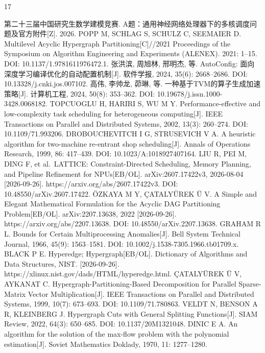 \documentclass[anonymous,notoc]{gmcm2026}
\begin{document}
\FloatBarrier
\clearpage\begin{thebibliography}{17}
\raggedright
{} 第二十三届中国研究生数学建模竞赛. A题：通用神经网络处理器下的多核调度问题及官方附件{[}Z{]}. 2026.
 POPP M, SCHLAG S, SCHULZ C, SEEMAIER D. Multilevel Acyclic Hypergraph Partitioning{[}C{]}//2021 Proceedings of the Symposium on Algorithm Engineering and Experiments (ALENEX). 2021: 1--15. DOI: 10.1137/1.9781611976472.1.
 张洪滨, 周旭林, 邢明杰, 等. AutoConfig: 面向深度学习编译优化的自动配置机制{[}J{]}. 软件学报, 2024, 35(6): 2668--2686. DOI: 10.13328/j.cnki.jos.007102.
 高伟, 李帅龙, 茆琳, 等. 一种基于TVM的算子生成加速策略{[}J{]}. 计算机工程, 2024, 50(8): 353--362. DOI: 10.19678/j.issn.1000-3428.0068182.
 TOPCUOGLU H, HARIRI S, WU M Y. Performance-effective and low-complexity task scheduling for heterogeneous computing{[}J{]}. IEEE Transactions on Parallel and Distributed Systems, 2002, 13(3): 260--274. DOI: 10.1109/71.993206.
 DROBOUCHEVITCH I G, STRUSEVICH V A. A heuristic algorithm for two-machine re-entrant shop scheduling{[}J{]}. Annals of Operations Research, 1999, 86: 417--439. DOI: 10.1023/A:1018927407164.
 LIU R, PEI M, DING F, et al.~LATTICE: Constraint-Directed Scheduling, Memory Planning, and Pipeline Refinement for NPUs{[}EB/OL{]}. arXiv:2607.17422v3, 2026-08-04 {[}2026-09-26{]}. https://arxiv.org/abs/2607.17422v3. DOI: 10.48550/arXiv.2607.17422.
 ÖZKAYA M Y, ÇATALYÜREK Ü V. A Simple and Elegant Mathematical Formulation for the Acyclic DAG Partitioning Problem{[}EB/OL{]}. arXiv:2207.13638, 2022 {[}2026-09-26{]}. https://arxiv.org/abs/2207.13638. DOI: 10.48550/arXiv.2207.13638.
 GRAHAM R L. Bounds for Certain Multiprocessing Anomalies{[}J{]}. Bell System Technical Journal, 1966, 45(9): 1563--1581. DOI: 10.1002/j.1538-7305.1966.tb01709.x.
 BLACK P E. Hyperedge; Hypergraph{[}EB/OL{]}. Dictionary of Algorithms and Data Structures, NIST. {[}2026-09-26{]}. https://xlinux.nist.gov/dads/HTML/hyperedge.html.
 ÇATALYÜREK Ü V, AYKANAT C. Hypergraph-Partitioning-Based Decomposition for Parallel Sparse-Matrix Vector Multiplication{[}J{]}. IEEE Transactions on Parallel and Distributed Systems, 1999, 10(7): 673--693. DOI: 10.1109/71.780863.
 VELDT N, BENSON A R, KLEINBERG J. Hypergraph Cuts with General Splitting Functions{[}J{]}. SIAM Review, 2022, 64(3): 650--685. DOI: 10.1137/20M1321048.
 DINIC E A. An algorithm for the solution of the max-flow problem with the polynomial estimation{[}J{]}. Soviet Mathematics Doklady, 1970, 11: 1277--1280.

\end{thebibliography}
\end{document}
